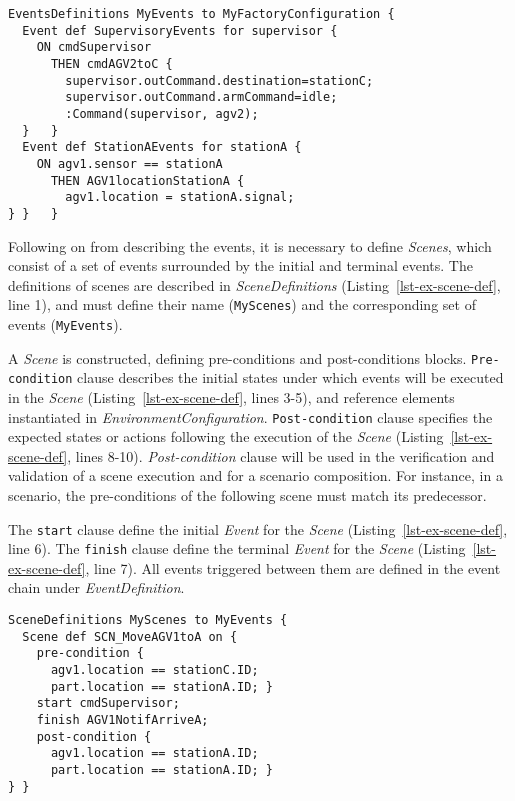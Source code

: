 \begin{lstlisting}[caption=Example of EventsDefinitions elements declarations, label={lst-ex-event-def}]
EventsDefinitions MyEvents to MyFactoryConfiguration {
  Event def SupervisoryEvents for supervisor {
    ON cmdSupervisor 
      THEN cmdAGV2toC {
        supervisor.outCommand.destination=stationC;
        supervisor.outCommand.armCommand=idle;
        :Command(supervisor, agv2); 
  }   }      
  Event def StationAEvents for stationA {		 
    ON agv1.sensor == stationA
      THEN AGV1locationStationA {
        agv1.location = stationA.signal; 
} }   } 
\end{lstlisting}

Following on from describing the events, it is necessary to define \textit{Scenes}, which consist of a set of events surrounded by the initial and terminal events. The definitions of scenes are described in \textit{SceneDefinitions} (Listing~\ref{lst-ex-scene-def}, line 1), and must define their name (\texttt{MyScenes}) and the corresponding set of events (\texttt{MyEvents}). 

A \textit{Scene} is constructed, defining pre-conditions and post-conditions blocks. \texttt{Pre-condition} clause describes the initial states under which events will be executed in the \textit{Scene} (Listing~\ref{lst-ex-scene-def}, lines 3-5), and reference elements instantiated in \textit{EnvironmentConfiguration}. \texttt{Post-condition} clause specifies the expected states or actions following the execution of the \textit{Scene} (Listing~\ref{lst-ex-scene-def}, lines 8-10). \textit{Post-condition} clause will be used in the verification and validation of a scene execution and for a scenario composition. For instance, in a scenario, the pre-conditions of the following scene must match its predecessor. 

The \texttt{start} clause define the initial \textit{Event} for the \textit{Scene} (Listing~\ref{lst-ex-scene-def}, line 6). The \texttt{finish} clause define the terminal \textit{Event} for the \textit{Scene} (Listing~\ref{lst-ex-scene-def}, line 7). All events triggered between them are defined in the event chain under \textit{EventDefinition}.

\begin{lstlisting}[caption=Example of SceneDefinitions elements declarations, label={lst-ex-scene-def}]
SceneDefinitions MyScenes to MyEvents {
  Scene def SCN_MoveAGV1toA on { 
    pre-condition {
      agv1.location == stationC.ID;
      part.location == stationA.ID; }
    start cmdSupervisor;
    finish AGV1NotifArriveA;
    post-condition {
      agv1.location == stationA.ID;
      part.location == stationA.ID; }
} }

\end{lstlisting}

